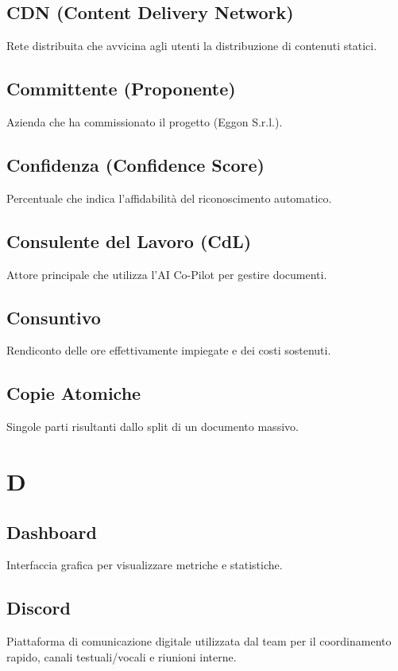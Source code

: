 \documentclass[a4paper,12pt]{article}
\begin{document}
\subsection{CDN (Content Delivery Network)}
Rete distribuita che avvicina agli utenti la distribuzione di contenuti statici.


\subsection{Committente (Proponente)}
Azienda che ha commissionato il progetto (Eggon S.r.l.).

\subsection{Confidenza (Confidence Score)}
Percentuale che indica l'affidabilità del riconoscimento automatico.

\subsection{Consulente del Lavoro (CdL)}
Attore principale che utilizza l'AI Co-Pilot per gestire documenti.

\subsection{Consuntivo}
Rendiconto delle ore effettivamente impiegate e dei costi sostenuti.

\subsection{Copie Atomiche}
Singole parti risultanti dallo split di un documento massivo.

\section{D}
\subsection{Dashboard}
Interfaccia grafica per visualizzare metriche e statistiche.

\subsection{Discord}
Piattaforma di comunicazione digitale utilizzata dal team per il coordinamento rapido, canali testuali/vocali e riunioni interne.
\end{document}
